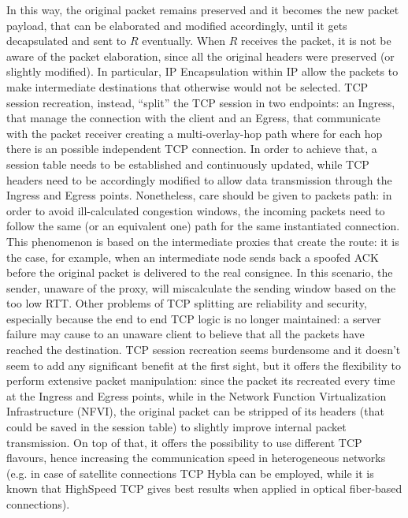 In this way, the original packet remains preserved and it becomes the new packet
payload, that can be elaborated and modified accordingly, until it gets
decapsulated and sent to $R$ eventually. When $R$ receives the packet, it is not
be aware of the packet elaboration, since all the original headers were
preserved (or slightly modified). In particular, IP Encapsulation within IP
allow the packets to make intermediate destinations that otherwise would not be
selected. TCP session recreation, instead, ``split'' the TCP session in two
endpoints: an Ingress, that manage the connection with the client and an Egress,
that communicate with the packet receiver creating a multi-overlay-hop path
where for each hop there is an possible independent TCP connection. In order to
achieve that, a session table needs to be established and continuously updated,
while TCP headers need to be accordingly modified to allow data transmission
through the Ingress and Egress points. Nonetheless, care should be given to
packets path: in order to avoid ill-calculated congestion windows, the incoming
packets need to follow the same (or an equivalent one) path for the same
instantiated connection. This phenomenon is based on the intermediate proxies
that create the route: it is the case, for example, when an intermediate node
sends back a spoofed ACK before the original packet is delivered to the real
consignee. In this scenario, the sender, unaware of the proxy, will miscalculate
the sending window based on the too low RTT. Other problems of TCP splitting are
reliability and security, especially because the end to end TCP logic is no
longer maintained: a server failure may cause to an unaware client to believe
that all the packets have reached the destination. TCP session recreation seems
burdensome and it doesn't seem to add any significant benefit at the first
sight, but it offers the flexibility to perform extensive packet manipulation:
since the packet its recreated every time at the Ingress and Egress points,
while in the Network Function Virtualization Infrastructure (NFVI), the original
packet can be stripped of its headers (that could be saved in the session table)
to slightly improve internal packet transmission.  On top of that, it offers the possibility to use different
TCP flavours, hence increasing the communication speed in heterogeneous networks
(e.g. in case of satellite connections TCP Hybla can be employed, while it is
known that HighSpeed TCP gives best results when applied in optical fiber-based
connections).

